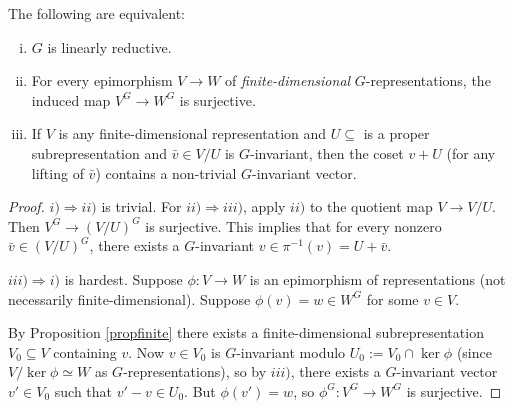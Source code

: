 \documentclass[11pt, english]{article}
\begin{document}
\begin{prop}
\label{proplinred}
The following are equivalent:
\begin{enumerate}[i)]
\item $G$ is linearly reductive.
\item For every epimorphism $V \to W$  of \emph{finite-dimensional} $G$-representations, the induced map $V^G \to W^G$ is surjective.
\item If $V$ is any finite-dimensional representation and $U \subseteq$ is a proper subrepresentation and $\bar v \in V/U$ is $G$-invariant, then the coset $v + U$ (for any lifting of $\bar v$) contains a non-trivial $G$-invariant vector.
\end{enumerate}
\end{prop}
\begin{proof}
$i) \Rightarrow ii)$ is trivial. For $ii) \Rightarrow iii)$, apply $ii)$ to the quotient map $V \to V/U$. Then $V^G \to (V/U)^G$ is surjective. This implies that for every nonzero $\bar v \in (V/U)^G$, there exists a $G$-invariant $v \in \pi^{-1}(v)=U+\bar v$.

$iii) \Rightarrow i)$ is hardest. Suppose $\phi:V \to W$ is an epimorphism of representations (not necessarily finite-dimensional). Suppose $\phi(v)=w \in W^G$ for some $v \in V$. 

By Proposition \ref{propfinite} there exists a finite-dimensional subrepresentation $V_0 \subseteq V$ containing $v$. Now $v \in V_0$ is $G$-invariant modulo $U_0 := V_0 \cap \ker \phi$ (since $V/\ker \phi \simeq W$ as $G$-representations), so by $iii)$, there exists a $G$-invariant vector $v' \in V_0$ such that $v'-v \in U_0$. But $\phi(v')=w$, so $\phi^G:V^G \to W^G$ is surjective.
\end{proof}
\end{document}
